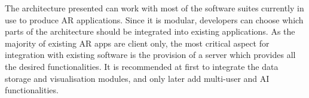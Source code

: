 \begin{table*}[ht]\centering
\caption{\fontsize{10pt}{11pt}}
\label{tab:summarypoc}
\end{table*}



The architecture presented can work with most of the software suites currently in use to produce AR applications. Since it is modular, developers can choose which parts of the architecture should be integrated into existing applications. As the majority of existing AR apps are client only, the most critical aspect for integration with existing software is the provision of a server which provides all the desired functionalities. It is recommended at first to integrate the data storage and visualisation modules, and only later add multi-user and AI functionalities.